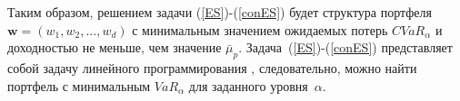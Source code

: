 Таким образом, решением задачи (\ref{ES})-(\ref{conES}) будет
структура портфеля $\textbf{w}=(w_1, w_2, \ldots, w_d)$ с минимальным значением ожидаемых потерь
$CVaR_\alpha$ и доходностью не меньше, чем значение $\bar{\mu}_p$.
Задача~(\ref{ES})-(\ref{conES}) %
представляет собой задачу линейного программирования
\cite{Rock2000}, следовательно, можно найти портфель с минимальным
$VaR_\alpha$ для заданного уровня~$\alpha$.




%
 
%

